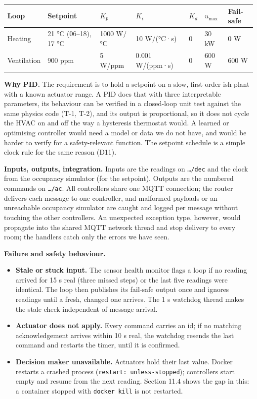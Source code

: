 \documentclass[11pt]{article}
\makeatletter
\providecommand{\tightlist}{\setlength{\itemsep}{0pt}\setlength{\parskip}{0pt}}
\DeclareRobustCommand{\_}{\ifmmode\nfss@text{\textunderscore}\else\textunderscore\allowbreak\fi}
\newcommand{\topic}[1]{\texttt{#1}}
\makeatother
\begin{document}
\begin{longtable}[]{@{}lllllll@{}}
\toprule
\textbf{Loop} & \textbf{Setpoint} & $K_p$ & $K_i$ & $K_d$ & $u_\text{max}$ & \textbf{Fail-safe} \\
\midrule
\endhead
Heating & 21 °C (06–18), 17 °C & 1000 W/°C & 10 W/(°C·s) & 0 & 30 kW & 0 W \\
Ventilation & 900 ppm & 5 W/ppm & 0.001 W/(ppm·s) & 0 & 600 W & 600 W \\
\bottomrule
\end{longtable}

\textbf{Why PID.} The requirement is to hold a setpoint on a slow, first-order-ish
plant with a known actuator range. A PID does that with three interpretable
parameters, its behaviour can be verified in a closed-loop unit test against the
same physics code (T-1, T-2), and its output is proportional, so it does not
cycle the HVAC on and off the way a hysteresis thermostat would. A learned
or optimising controller would need a model or data we do not have, and would be
harder to verify for a safety-relevant function. The setpoint schedule is a simple
clock rule for the same reason (D11).

\textbf{Inputs, outputs, integration.} Inputs are the readings on
\topic{…/dec} and the clock from the occupancy simulator (for the setpoint).
Outputs are the numbered commands on \topic{…/ac}. All controllers share one MQTT
connection; the router delivers each message to one controller, and malformed
payloads or an unreachable occupancy simulator are caught and logged per message
without touching the other controllers. An unexpected exception type, however,
would propagate into the shared MQTT network thread and stop delivery to every
room; the handlers catch only the errors we have seen.

\textbf{Failure and safety behaviour.}
\begin{itemize}
\tightlist
\item \textbf{Stale or stuck input.} The sensor health monitor flags a loop if no
  reading arrived for 15 s real (three missed steps) or the last five readings
  were identical. The loop then publishes its fail-safe output once and ignores
  readings until a fresh, changed one arrives. The 1 s watchdog thread makes the
  stale check independent of message arrival.
\item \textbf{Actuator does not apply.} Every command carries an id; if no
  matching acknowledgement arrives within 10 s real, the watchdog resends the last
  command and restarts the timer, until it is confirmed.
\item \textbf{Decision maker unavailable.} Actuators hold their last value. Docker
  restarts a crashed process (\texttt{restart: unless-stopped}); controllers start
  empty and resume from the next reading. Section 11.4 shows the gap in this: a
  container stopped with \texttt{docker kill} is not restarted.
\end{itemize}
\end{document}
